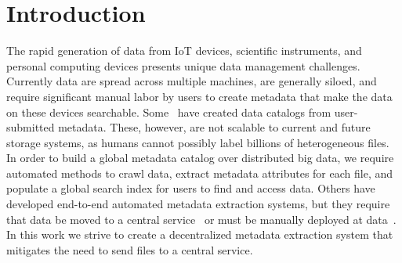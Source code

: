 \documentclass[sigconf, 9pt]{acmart}
\begin{document}
\section{Introduction}

The rapid generation of data from IoT devices, scientific instruments, and personal computing devices presents unique 
data management challenges. Currently data are spread across multiple machines, are generally siloed, and require 
significant manual labor by users to create metadata that make the data on these devices searchable. Some~\cite{egan2003vizier, welter2013nhgri, irods, dataverse}  have created data catalogs from user-submitted metadata. These, however, are not scalable to current and future storage systems,
as humans cannot possibly label billions of heterogeneous files. 
In order to build a global metadata catalog over distributed big data, we require automated methods to crawl data, extract 
metadata attributes for each file, and populate a global search index for users to find and access data. Others have developed end-to-end 
automated metadata extraction systems, but they require that data be moved to a central service~\cite{skluzacek2018skluma, skluzacek2016klimatic, padhy2015brown, rodrigo2018sciencesearch} or must be manually deployed at data~\cite{mattmann2011tika}. 
In this work we strive to create a decentralized metadata extraction system that mitigates the need to send files to a central service.  

\end{document}
